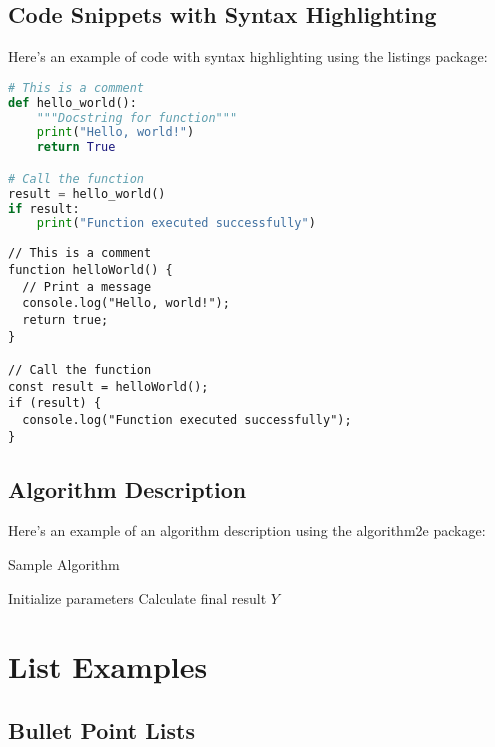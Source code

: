 \documentclass[a4paper,11pt,xetex]{article}
\begin{document}
\subsection{Code Snippets with Syntax Highlighting}

Here's an example of code with syntax highlighting using the listings package:

\begin{lstlisting}[language=Python, caption=Sample Python Code]
# This is a comment
def hello_world():
    """Docstring for function"""
    print("Hello, world!")
    return True

# Call the function
result = hello_world()
if result:
    print("Function executed successfully")
\end{lstlisting}

\begin{verbatim}
// This is a comment
function helloWorld() {
  // Print a message
  console.log("Hello, world!");
  return true;
}

// Call the function
const result = helloWorld();
if (result) {
  console.log("Function executed successfully");
}
\end{verbatim}

\subsection{Algorithm Description}

Here's an example of an algorithm description using the algorithm2e package:

\begin{algorithm}[H]
\caption{Sample Algorithm}
\SetAlgoLined
{}
Initialize parameters\;
Calculate final result $Y$\;
\;
\end{algorithm}

\section{List Examples}

\subsection{Bullet Point Lists}
\end{document}
